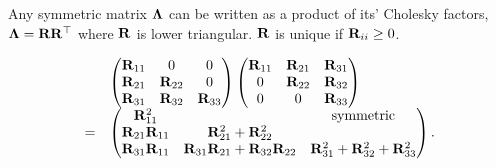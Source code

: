 	
Any symmetric matrix ${\boldsymbol \Lambda}$ can be written as a product of its' Cholesky factors, ${\boldsymbol \Lambda} =
{\bf R} {\bf R}^\top$ where ${\bf R}$ is lower triangular. ${\bf R}$ is unique if ${\bf R}_{ii} \geq 0$.
	
\begin{equation}
\begin{array}{lll}
	&\begin{pmatrix}
	{\bf R}_{11}          & 0                                    & 0                                     \\
	{\bf R}_{21}          & {\bf R}_{22}                             & 0                                     \\
	{\bf R}_{31}          & {\bf R}_{32}                             & {\bf R}_{33}                              
	\end{pmatrix}
	\begin{pmatrix}
	{\bf R}_{11}          & {\bf R}_{21}                             & {\bf R}_{31}                              \\
	0                 & {\bf R}_{22}                             & {\bf R}_{32}                              \\
	0                 & 0                                    & {\bf R}_{33}                              
	\end{pmatrix}
	\\
	=& \begin{pmatrix}
	{\bf R}_{11}^2        &                                      & \text{symmetric}                      \\
	{\bf R}_{21}{\bf R}_{11} & {\bf R}_{21}^2 + {\bf R}_{22}^2 \\
	{\bf R}_{31} {\bf R}_{11} & {\bf R}_{31}{\bf R}_{21} + {\bf R}_{32} {\bf R}_{22} & {\bf R}_{31}^2 + {\bf R}_{32} ^2 + {\bf R}_{33}^2 
	\end{pmatrix}.
\end{array}
\end{equation}


